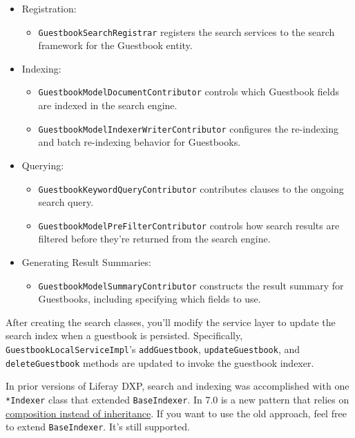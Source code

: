 \begin{itemize}
\item
  Registration:

  \begin{itemize}
  \tightlist
  \item
    \texttt{GuestbookSearchRegistrar} registers the search services to
    the search framework for the Guestbook entity.
  \end{itemize}
\item
  Indexing:

  \begin{itemize}
  \item
    \texttt{GuestbookModelDocumentContributor} controls which Guestbook
    fields are indexed in the search engine.
  \item
    \texttt{GuestbookModelIndexerWriterContributor} configures the
    re-indexing and batch re-indexing behavior for Guestbooks.
  \end{itemize}
\item
  Querying:

  \begin{itemize}
  \item
    \texttt{GuestbookKeywordQueryContributor} contributes clauses to the
    ongoing search query.
  \item
    \texttt{GuestbookModelPreFilterContributor} controls how search
    results are filtered before they're returned from the search engine.
  \end{itemize}
\item
  Generating Result Summaries:

  \begin{itemize}
  \tightlist
  \item
    \texttt{GuestbookModelSummaryContributor} constructs the result
    summary for Guestbooks, including specifying which fields to use.
  \end{itemize}
\end{itemize}

After creating the search classes, you'll modify the service layer to
update the search index when a guestbook is persisted. Specifically,
\texttt{GuestbookLocalServiceImpl}'s \texttt{addGuestbook},
\texttt{updateGuestbook}, and \texttt{deleteGuestbook} methods are
updated to invoke the guestbook indexer.

In prior versions of Liferay DXP, search and indexing was accomplished
with one \texttt{*Indexer} class that extended \texttt{BaseIndexer}. In
7.0 is a new pattern that relies on
\href{https://stackoverflow.com/questions/2399544/difference-between-inheritance-and-composition}{composition
instead of inheritance}. If you want to use the old approach, feel free
to extend \texttt{BaseIndexer}. It's still supported.

